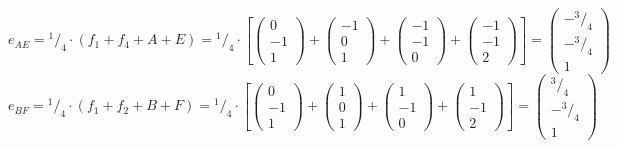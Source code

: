 \documentclass{article}
\newcommand*\rfrac[2]{{}^{#1}\!/_{#2}}%
\begin{document}
\[e_{AE}=\rfrac{1}{4}\cdot(f_1+f_4+A+E)=\rfrac{1}{4}\cdot\left[
\left({\begin{array}{c} 0 \\  -1 \\ 1 \end{array}}\right)+
\left({\begin{array}{c} -1 \\ 0 \\ 1 \end{array}}\right)+
\left({\begin{array}{c} -1 \\ -1 \\ 0 \end{array}}\right)+
\left({\begin{array}{c} -1 \\  -1 \\ 2 \end{array}}\right)\right]=
\left({\begin{array}{c}  -\rfrac{3}{4} \\ -\rfrac{3}{4} \\ 1 \end{array}}\right)
\]
\[e_{BF}=\rfrac{1}{4}\cdot(f_1+f_2+B+F)=\rfrac{1}{4}\cdot\left[
\left({\begin{array}{c} 0 \\  -1 \\ 1 \end{array}}\right)+
\left({\begin{array}{c} 1 \\ 0 \\ 1 \end{array}}\right)+
\left({\begin{array}{c} 1 \\ -1 \\ 0 \end{array}}\right)+
\left({\begin{array}{c} 1 \\  -1 \\ 2 \end{array}}\right)\right]=
\left({\begin{array}{c}  \rfrac{3}{4} \\ -\rfrac{3}{4} \\ 1 \end{array}}\right)
\]
\end{document}
